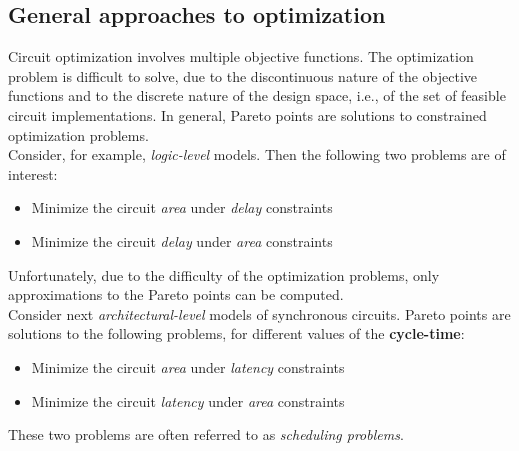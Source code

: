 \subsection{General approaches to optimization}
Circuit optimization involves multiple objective functions. The optimization problem is difficult to solve, due to the discontinuous nature of the objective functions and to the discrete nature of the design space, i.e., of the set of feasible circuit implementations. In general, Pareto points  are  solutions to constrained optimization problems.\\
Consider, for example, \textit{logic-level} models. Then the following two problems are of interest:
\begin{itemize}
\item Minimize the circuit  \textit{area}  under  \textit{delay} constraints
\item Minimize the circuit  \textit{delay}  under  \textit{area} constraints
\end{itemize}
Unfortunately, due to the difficulty of the optimization problems, only approximations to the Pareto points can be computed.\\
Consider next \textit{architectural-level} models of synchronous circuits. Pareto points are solutions to the following problems, for different values of the \textbf{cycle-time}:
\begin{itemize}
\item Minimize the circuit \textit{area} under \textit{latency} constraints
\item Minimize the circuit \textit{latency} under \textit{area} constraints
\end{itemize}
These two problems are often referred to as \textit{scheduling problems}.
